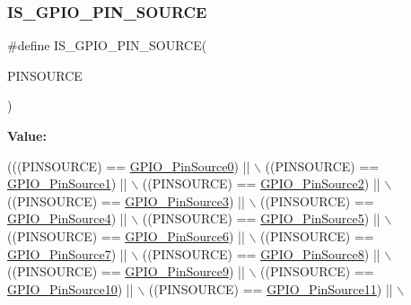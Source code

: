 \subsubsection{\texorpdfstring{I\+S\+\_\+\+G\+P\+I\+O\+\_\+\+P\+I\+N\+\_\+\+S\+O\+U\+R\+CE}{IS\_GPIO\_PIN\_SOURCE}}
{\footnotesize\ttfamily \#define I\+S\+\_\+\+G\+P\+I\+O\+\_\+\+P\+I\+N\+\_\+\+S\+O\+U\+R\+CE(\begin{DoxyParamCaption}\item[{}]{P\+I\+N\+S\+O\+U\+R\+CE }\end{DoxyParamCaption})}

{\bfseries Value\+:}
\begin{DoxyCode}
(((PINSOURCE) == \hyperlink{group___g_p_i_o___pin__sources_ga028bcbdf5a7fd81ec45830f60a022bb4}{GPIO\_PinSource0}) || \(\backslash\)
                                       ((PINSOURCE) == \hyperlink{group___g_p_i_o___pin__sources_gad02324cdd8526a7aacd15a5a910d56f1}{GPIO\_PinSource1}) || \(\backslash\)
                                       ((PINSOURCE) == \hyperlink{group___g_p_i_o___pin__sources_ga7808fb6269890fa1e37a322418884607}{GPIO\_PinSource2}) || \(\backslash\)
                                       ((PINSOURCE) == \hyperlink{group___g_p_i_o___pin__sources_ga0df17fee84ec9ab096b5525a06871863}{GPIO\_PinSource3}) || \(\backslash\)
                                       ((PINSOURCE) == \hyperlink{group___g_p_i_o___pin__sources_gaf5aa545455dacbf315a40cecd0842b6c}{GPIO\_PinSource4}) || \(\backslash\)
                                       ((PINSOURCE) == \hyperlink{group___g_p_i_o___pin__sources_gaf231e680fe2db4ea44a7fd0f5d5c5875}{GPIO\_PinSource5}) || \(\backslash\)
                                       ((PINSOURCE) == \hyperlink{group___g_p_i_o___pin__sources_gada41b6bd03b2873a2400628df0a1026e}{GPIO\_PinSource6}) || \(\backslash\)
                                       ((PINSOURCE) == \hyperlink{group___g_p_i_o___pin__sources_ga609974472a3a7c5274fc56018d7adf16}{GPIO\_PinSource7}) || \(\backslash\)
                                       ((PINSOURCE) == \hyperlink{group___g_p_i_o___pin__sources_ga6f5962c5b2ce5734734563bdad18fbd6}{GPIO\_PinSource8}) || \(\backslash\)
                                       ((PINSOURCE) == \hyperlink{group___g_p_i_o___pin__sources_gabaaed5961f2b9862082f74e18f5c3f0e}{GPIO\_PinSource9}) || \(\backslash\)
                                       ((PINSOURCE) == \hyperlink{group___g_p_i_o___pin__sources_gacec97d9c2d319b450f699adff6430c86}{GPIO\_PinSource10}) || \(\backslash\)
                                       ((PINSOURCE) == \hyperlink{group___g_p_i_o___pin__sources_ga446be4a99e84eefb5c71a643211f598b}{GPIO\_PinSource11}) || \(\backslash\)

\end{DoxyCode}
